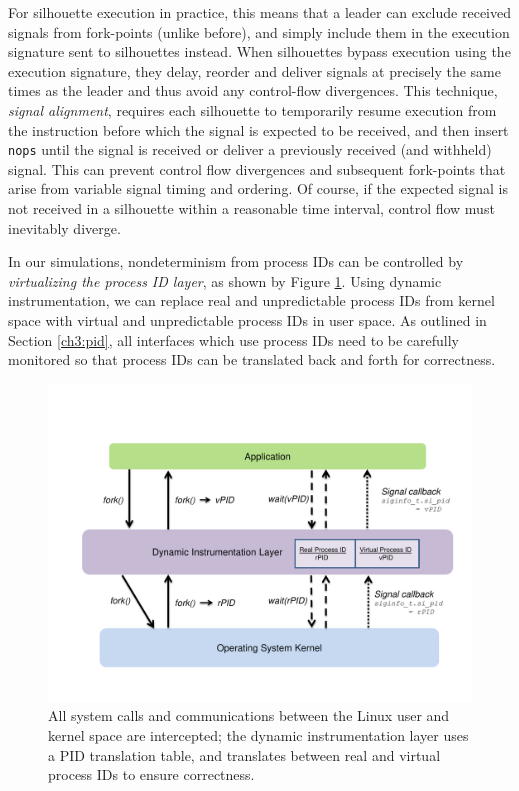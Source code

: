 For silhouette execution in practice, this means that a leader can exclude
received signals from fork-points (unlike before),
and simply include them in the execution signature sent to silhouettes
instead. When silhouettes bypass execution using the execution signature,
they delay, reorder and deliver signals at precisely the 
same times as the leader and thus avoid any control-flow divergences. 
This technique, {\em signal alignment}, 
requires each silhouette to temporarily
resume execution from the instruction before which the signal is
expected to be received, and then insert \texttt{nops}
until the signal is received or deliver a previously
received (and withheld) signal.
This can prevent control
flow divergences and subsequent fork-points that arise from 
variable signal timing and ordering.
Of course, if the expected
signal is not received in a silhouette
within a reasonable time interval, 
control flow must inevitably diverge.
\newline

 \newline
In our simulations, nondeterminism from process IDs
can be controlled by {\em virtualizing the process ID layer}, 
as shown by Figure \ref{ch3:pidfig}.
Using dynamic instrumentation, we can replace
real and unpredictable process IDs from kernel space
with virtual and unpredictable process IDs in user space.
As outlined in Section \ref{ch3:pid}, all interfaces
which use process IDs need to be carefully monitored
so that process IDs can be translated back and forth
for correctness. 

\begin{figure}[t]
  \center
  \includegraphics[trim=0cm 1cm 0cm 0.5cm, scale=0.60]{pid.pdf}
  \caption[Virtualizing the process ID layer using Pin]%
  {All system calls and communications
  between the Linux user and kernel space are intercepted; 
  the dynamic instrumentation layer
  uses a PID translation table, and
  translates between real and virtual process IDs
  to ensure correctness. }
  
  \label{ch3:pidfig}
\end{figure} 

